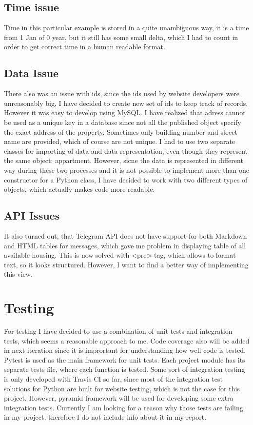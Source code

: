 \documentclass[a4paper,11pt]{article}
\begin{document}
\subsection{Time issue} Time in this particular example is stored in a quite unambiguous way, it is a time from 1 Jan of 0 year, but it still has some small delta, which I had to count in order to get correct time in a human readable format. 
\subsection{Data Issue} There also was an issue with ids, since the ids used by website developers were unreasonably big, I have decided to create new set of ids to keep track of records. However it was easy to develop using MySQL. 
I have realized that adress cannot be used as a unique key in a database since not all the published object specify the exact address of the property. Sometimes only building number and street name are provided, which of course are not unique.
I had to use two separate classes for importing of data and data representation, even though they represent the same object: appartment. However, sicne the data is represented in different way during these two processes and it is not possible to implement more than one constructor for a Python class, I have decided to work with two different types of objects, which actually makes code more readable.
\subsection{API Issues} It also turned out, that Telegram API does not have support for both Markdown and HTML tables for messages, which gave me problem in displaying table of all available housing. This is now solved with <pre> tag, which allows to format text, so it looks structured. However, I want to find a better way of implementing this view.

\section{Testing}
For testing I have decided to use a combination of unit tests and integration tests, which seems a reasonable approach to me. Code coverage also will be added in next iteration since it is imprortant for understanding how well code is tested.
Pytest is used as the main framework for unit tests. Each project module has its separate tests file, where each function is tested. Some sort of integration testing is only developed with Travis CI so far, since most of the integration test solutions for Python are built for website testing, which is not the case for this project. However, pyramid framework will be used for developing some extra integration tests. Currently I am looking for a reason why those tests are failing in my project, therefore I do not include info about it in my report.
\end{document}
